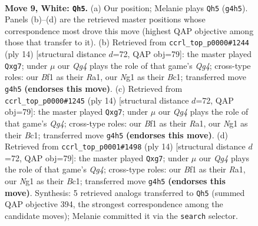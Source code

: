 \documentclass[11pt]{article}
\begin{document}
\clearpage

\begin{figure}[p]\centering
\begin{subfigure}{0.46\textwidth}\centering
\resizebox{\linewidth}{!}{%
\newchessgame
\chessboard[
  setfen={rnb2r1k/pppnqppp/4p3/3pP3/3P1PQ1/2N5/PPP3PP/R3KBNR w KQ - 3 9},
  showmover=false,
  pgfstyle=straightmove, color=movearrow, markmove={g4-h5}
]}
\caption{}
\end{subfigure}\hfill
\begin{subfigure}{0.46\textwidth}\centering
\resizebox{\linewidth}{!}{%
\newchessgame
\chessboard[
  setfen={rnb1k2r/ppq1nppp/4p3/2ppP3/3P2Q1/P1P5/2P2PPP/R1B1KBNR w KQkq - 3 8},
  showmover=false,
  pgfstyle=straightmove, color=movearrow, markmove={g4-g7}
]}
\caption{}
\end{subfigure}
\\[4pt]
\begin{subfigure}{0.46\textwidth}\centering
\resizebox{\linewidth}{!}{%
\newchessgame
\chessboard[
  setfen={rnb1k2r/ppq1nppp/4p3/2ppP3/3P2Q1/P1P5/2P2PPP/R1B1KBNR w KQkq - 3 8},
  showmover=false,
  pgfstyle=straightmove, color=movearrow, markmove={g4-g7}
]}
\caption{}
\end{subfigure}\hfill
\begin{subfigure}{0.46\textwidth}\centering
\resizebox{\linewidth}{!}{%
\newchessgame
\chessboard[
  setfen={rnb1k2r/ppq1nppp/4p3/2ppP3/3P2Q1/P1P5/2P2PPP/R1B1KBNR w KQkq - 2 8},
  showmover=false,
  pgfstyle=straightmove, color=movearrow, markmove={g4-g7}
]}
\caption{}
\end{subfigure}
\caption{\textbf{Move 9, White: \texttt{Qh5}.} (a) Our position; Melanie plays \texttt{Qh5} (\texttt{g4h5}). Panels (b)--(d) are the retrieved master positions whose correspondence most drove this move (highest QAP objective among those that transfer to it). (b) Retrieved from \texttt{ccrl\_top\_p0000\#1244} (ply 14) [structural distance $d$=72, QAP obj=79]: the master played \texttt{Qxg7}; under $\mu$ our \emph{Qg4} plays the role of that game's \emph{Qg4}; cross-type roles: our \emph{B}f1 as their \emph{R}a1, our \emph{N}g1 as their \emph{B}c1; transferred move \texttt{g4h5} \textbf{(endorses this move)}. (c) Retrieved from \texttt{ccrl\_top\_p0000\#1245} (ply 14) [structural distance $d$=72, QAP obj=79]: the master played \texttt{Qxg7}; under $\mu$ our \emph{Qg4} plays the role of that game's \emph{Qg4}; cross-type roles: our \emph{B}f1 as their \emph{R}a1, our \emph{N}g1 as their \emph{B}c1; transferred move \texttt{g4h5} \textbf{(endorses this move)}. (d) Retrieved from \texttt{ccrl\_top\_p0001\#1498} (ply 14) [structural distance $d$=72, QAP obj=79]: the master played \texttt{Qxg7}; under $\mu$ our \emph{Qg4} plays the role of that game's \emph{Qg4}; cross-type roles: our \emph{B}f1 as their \emph{R}a1, our \emph{N}g1 as their \emph{B}c1; transferred move \texttt{g4h5} \textbf{(endorses this move)}. Synthesis: 5 retrieved analogs transferred to \texttt{Qh5} (summed QAP objective 394, the strongest correspondence among the candidate moves); Melanie committed it via the \texttt{search} selector.}
\label{fig:thought-m16}
\end{figure}
\end{document}
